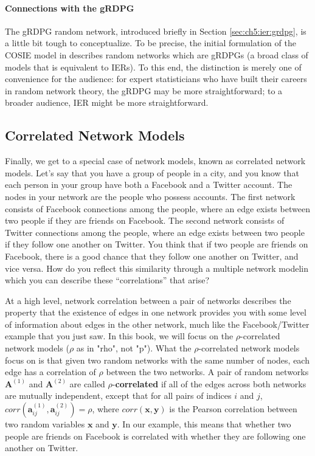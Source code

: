 \paragraph{Connections with the gRDPG}

The gRDPG random network, introduced briefly in Section \ref{sec:ch5:ier:grdpg}, is a little bit tough to conceptualize. To be precise, the initial formulation of the COSIE model in \cite{Arroyo2021} describes random networks which are gRDPGs (a broad class of models that is equivalent to IERs). To this end, the distinction is merely one of convenience for the audience: for expert statisticians who have built their careers in random network theory, the gRDPG may be more straightforward; to a broader audience, IER might be more straightforward. 

\subsection{Correlated Network Models}
\label{sec:ch5:multi:corr}

Finally, we get to a special case of network models, known as correlated network models. Let's say that you have a group of people in a city, and you know that each person in your group have both a Facebook and a Twitter account. The nodes in your network are the people who possess accounts. The first network consists of Facebook connections among the people, where an edge exists between two people if they are friends on Facebook. The second network consists of Twitter connections among the people, where an edge exists between two people if they follow one another on Twitter. You think that if two people are friends on Facebook, there is a good chance that they follow one another on Twitter, and vice versa. How do you reflect this similarity through a multiple network modelin which you can describe these ``correlations'' that arise?

At a high level, network correlation between a pair of networks describes the property that the existence of edges in one network provides you with some level of information about edges in the other network, much like the Facebook/Twitter example that you just saw. In this book, we will focus on the $\rho$-{correlated} network models ($\rho$ as in "rho", not "p"). What the $\rho$-correlated network models focus on is that given two random networks with the same number of nodes, each edge has a correlation of $\rho$ between the two networks. A pair of random networks $\mathbf A^{(1)}$ and $\mathbf A^{(2)}$ are called $\rho$-\textbf{correlated} if all of the edges across both networks are mutually independent, except that for all pairs of indices $i$ and $j$, $corr(\mathbf a_{ij}^{(1)}, \mathbf a_{ij}^{(2)}) = \rho$, where $corr(\mathbf x, \mathbf y)$ is the Pearson correlation between two random variables $\mathbf x$ and $\mathbf y$. In our example, this means that whether two people are friends on Facebook is {correlated} with whether they are following one another on Twitter.

